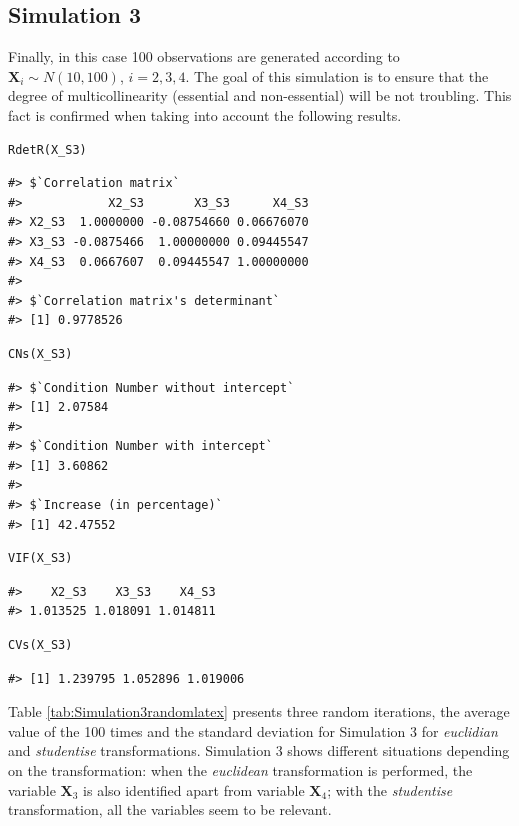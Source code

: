 \hypertarget{simulation-3}{%
\subsection{Simulation 3}\label{simulation-3}}

Finally, in this case 100 observations are generated according to \(\mathbf{X}_{i} \sim N(10, 100)\), \(i=2,3,4\). The goal of this simulation is to ensure that the degree of multicollinearity (essential and non-essential) will be not troubling. This fact is confirmed when taking into account the following results.

\begin{verbatim}
RdetR(X_S3)
\end{verbatim}

\begin{verbatim}
#> $`Correlation matrix`
#>            X2_S3       X3_S3      X4_S3
#> X2_S3  1.0000000 -0.08754660 0.06676070
#> X3_S3 -0.0875466  1.00000000 0.09445547
#> X4_S3  0.0667607  0.09445547 1.00000000
#> 
#> $`Correlation matrix's determinant`
#> [1] 0.9778526
\end{verbatim}

\begin{verbatim}
CNs(X_S3)
\end{verbatim}

\begin{verbatim}
#> $`Condition Number without intercept`
#> [1] 2.07584
#> 
#> $`Condition Number with intercept`
#> [1] 3.60862
#> 
#> $`Increase (in percentage)`
#> [1] 42.47552
\end{verbatim}

\begin{verbatim}
VIF(X_S3)
\end{verbatim}

\begin{verbatim}
#>    X2_S3    X3_S3    X4_S3 
#> 1.013525 1.018091 1.014811
\end{verbatim}

\begin{verbatim}
CVs(X_S3)
\end{verbatim}

\begin{verbatim}
#> [1] 1.239795 1.052896 1.019006
\end{verbatim}

Table \ref{tab:Simulation3randomlatex} presents three random iterations, the average value of the 100 times and the standard deviation for Simulation 3 for \emph{euclidian} and \emph{studentise} transformations. Simulation 3 shows different situations depending on the transformation: when the \emph{euclidean} transformation is performed, the variable \(\mathbf{X}_{3}\) is also identified apart from variable \(\mathbf{X}_{4}\); with the \emph{studentise} transformation, all the variables seem to be relevant.


